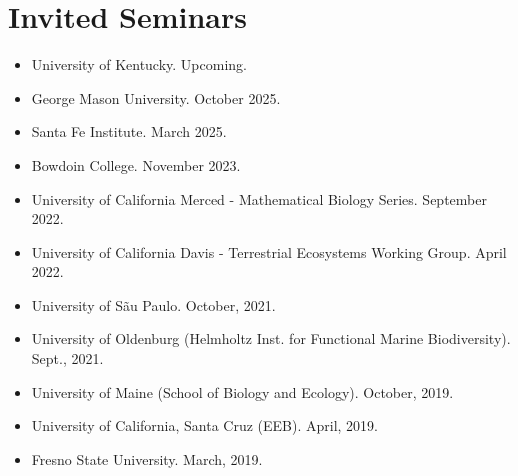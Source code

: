 \documentclass[margin,line,12pt]{res}
\begin{document}
\begin{resume}
\begin{itemize}
\end{itemize}


\section{\sc Invited Seminars}
\begin{itemize}

\item University of Kentucky. Upcoming.

\item George Mason University. October 2025.

\item Santa Fe Institute. March 2025.

\item Bowdoin College. November 2023.

\item University of California Merced - Mathematical Biology Series. September 2022.

\item University of California Davis - Terrestrial Ecosystems Working Group. April 2022.

\item University of S\~au Paulo. October, 2021.

\item University of Oldenburg (Helmholtz Inst. for Functional Marine Biodiversity). Sept., 2021.

\item University of Maine (School of Biology and Ecology). October, 2019.

\item University of California, Santa Cruz (EEB). April, 2019.

\item Fresno State University. March, 2019.


\end{itemize}
\end{resume}
\end{document}
